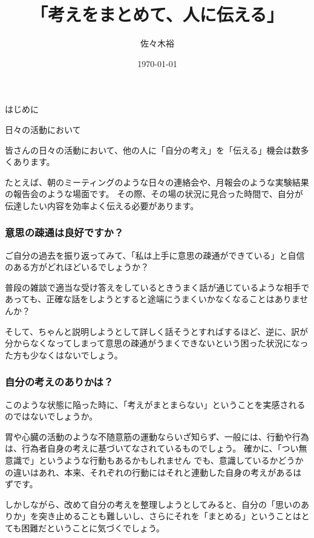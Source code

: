 \documentclass[12pt,a4paper]{jsarticle}
\title{「考えをまとめて、人に伝える」}
\author{佐々木裕}
\date{\today}
\makeatletter
\def\section{\@startsection 
{section}
{1}
{\z@}
{3.5ex plus -1ex minus -.2ex}
{1.5ex plus .2ex}
{\large\bf}
}
\def\subsection{\@startsection 
{subsection}
{1}
{\z@}
{3.5ex plus -1ex minus -.2ex}
{1.ex plus .2ex}
{\large\bf}
}
\makeatother
\begin{document}
\maketitle

\section{はじめに}


\subsection{日々の活動において}

皆さんの日々の活動において、他の人に「自分の考え」を「伝える」機会は数多くあります。

たとえば、朝のミーティングのような日々の連絡会や、月報会のような実験結果の報告会のような場面です。
その際、その場の状況に見合った時間で、自分が伝達したい内容を効率よく伝える必要があります。

\subsubsection{意思の疎通は良好ですか？}

ご自分の過去を振り返ってみて、「私は上手に意思の疎通ができている」と自信のある方がどれほどいるでしょうか？

普段の雑談で適当な受け答えをしているときうまく話が通じているような相手であっても、正確な話をしようとすると途端にうまくいかなくなることはありませんか？

そして、ちゃんと説明しようとして詳しく話そうとすればするほど、逆に、訳が分からなくなってしまって意思の疎通がうまくできないという困った状況になった方も少なくはないでしょう。

\subsubsection{自分の考えのありかは？}

このような状態に陥った時に、「考えがまとまらない」ということを実感されるのではないでしょうか。

胃や心臓の活動のような不随意筋の運動ならいざ知らず、一般には、行動や行為は、行為者自身の考えに基づいてなされているものでしょう。
確かに、「つい無意識で」というような行動もあるかもしれません
でも、意識しているかどうかの違いはあれ、本来、それぞれの行動にはそれと連動した自身の考えがあるはずです。

しかしながら、改めて自分の考えを整理しようとしてみると、自分の「思いのありか」を突き止めることも難しいし、さらにそれを「まとめる」ということはとても困難だということに気づくでしょう。
\end{document}
